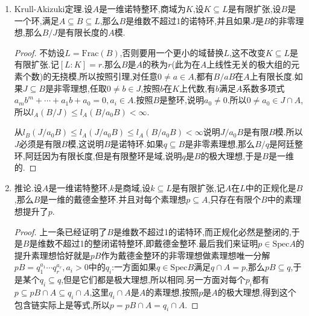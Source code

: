 \begin{enumerate}
\begin{proof}
		于是有$l(M/a^nM)\le l(E/a^nE)+l(C),\forall n>0$.按照$M$和$E$都是无挠$A$模,得到$a^iM/a^{i+1}M\cong M/aM$和$a^iE/a^{i+1}E\cong E/aE$.所以有$nl(M/aM)\le nl(E/aE)+l(C),\forall n>0$,所以有$l(E/aE)\ge l(M/aM)$.再按照$E\cong A^r$,得到$l(E/aE)=rl(A/aA)$.至此我们完成了$M$是有限$A$模情况下引理的证明.
		
		\qquad
		
		下面设$M$未必是有限$A$模.取$\overline{M}=M/aM$的有限子模$\overline{N}=A\overline{\omega_1}+\cdots+A\overline{\omega_s}$.取$\overline{\omega_i}$的一个提升为$\omega_i$,记$M_1=\sum A\omega_i$.那么有$l(\sum A\overline{\omega_i})=l(M_1/M_1\cap aM)\le l(M_1/aM_1)\le rl(A/aA)$.这个不等式右侧不依赖$\overline{N}$,所以$\overline{M}$实际上是有限生成(长度的),并且有$l(\overline{M})\le rl(A/aA)$.完成证明.	
	\end{proof}
	\item Krull-Akizuki定理.设$A$是一维诺特整环,商域为$K$,设$K\subseteq L$是有限扩张,设$B$是一个环,满足$A\subseteq B\subseteq L$,那么$B$是维数不超过1的诺特环,并且如果$J$是$B$的非零理想,那么$B/J$是有限长度的$A$模.
	\begin{proof}
		
		不妨设$L=\mathrm{Frac}(B)$,否则要用一个更小的域替换$L$,这不改变$K\subseteq L$是有限扩张.记$[L:K]=r$.那么$B$是$A$的秩为$r$(此为在$A$上线性无关的极大组的元素个数)的无挠模,所以按照引理,对任意$0\not=a\in A$,都有$B/aB$在$A$上有限长度.如果$J\subseteq B$是非零理想,任取$0\not=b\in J$,按照$b$在$K$上代数,有$b$满足$A$系数多项式$a_mb^m+\cdots+a_1b+a_0=0,a_i\in A$.按照$B$是整环,说明$a_0\not=0$.所以$0\not=a_0\in J\cap A$,所以$l_A(B/J)\le l_A(B/a_0B)<\infty$.
		
		\qquad
		
		从$l_B(J/a_0B)\le l_A(J/a_0B)\le l_A(B/a_0B)<\infty$说明$J/a_0B$是有限$B$模.所以$J$必须是有限$B$模,这说明$B$是诺特环.如果$q\subseteq B$是非零素理想,那么$B/q$是阿廷整环,阿廷因为有限长度,但是有限整环是域,说明$q$是$B$的极大理想,于是$B$是一维的.
	\end{proof}
	\item 推论.设$A$是一维诺特整环,$k$是商域,设$k\subseteq L$是有限扩张,记$A$在$L$中的正规化是$B$,那么$B$是一维的戴德金整环.并且对每个素理想$p\subseteq A$,只存在有限个$B$中的素理想提升了$p$.
	\begin{proof}
		
		上一条已经证明了$B$是维数不超过1的诺特环,而正规化必然是整闭的,于是$B$是维数不超过1的整闭诺特整环,即戴德金整环.最后我们来证明$p\in\mathrm{Spec}A$的提升素理想恰好就是$pB$作为戴德金整环的非零理想做素理想唯一分解$pB=q_1^{a_1}\cdots q_r^{a_r},a_i>0$中的$q_i$:一方面如果$q\in\mathrm{Spec}B$满足$q\cap A=p$,那么$pB\subseteq q$,于是某个$q_i\subseteq q$,但是它们都是极大理想,所以相同.另一方面对每个$p_i$都有$p\subseteq pB\cap A\subseteq q_i\cap A$,这里$q_i\cap A$是$A$的素理想,按照$p$是$A$的极大理想,得到这个包含链实际上是等式,所以$p=pB\cap A=q_i\cap A$.
	\end{proof}
\end{enumerate}
\newpage
